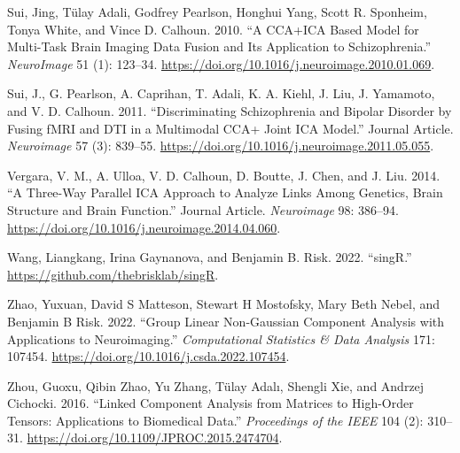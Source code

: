 \begin{CSLReferences}{1}{0}
\leavevmode{}%
Sui, Jing, Tülay Adali, Godfrey Pearlson, Honghui Yang, Scott R. Sponheim, Tonya White, and Vince D. Calhoun. 2010. {``A CCA+ICA Based Model for Multi-Task Brain Imaging Data Fusion and Its Application to Schizophrenia.''} \emph{NeuroImage} 51 (1): 123--34. \url{https://doi.org/10.1016/j.neuroimage.2010.01.069}.

\leavevmode{}%
Sui, J., G. Pearlson, A. Caprihan, T. Adali, K. A. Kiehl, J. Liu, J. Yamamoto, and V. D. Calhoun. 2011. {``Discriminating Schizophrenia and Bipolar Disorder by Fusing fMRI and DTI in a Multimodal CCA+ Joint ICA Model.''} Journal Article. \emph{Neuroimage} 57 (3): 839--55. \url{https://doi.org/10.1016/j.neuroimage.2011.05.055}.

\leavevmode{}%
Vergara, V. M., A. Ulloa, V. D. Calhoun, D. Boutte, J. Chen, and J. Liu. 2014. {``A Three-Way Parallel ICA Approach to Analyze Links Among Genetics, Brain Structure and Brain Function.''} Journal Article. \emph{Neuroimage} 98: 386--94. \url{https://doi.org/10.1016/j.neuroimage.2014.04.060}.

\leavevmode{}%
Wang, Liangkang, Irina Gaynanova, and Benjamin B. Risk. 2022. {``{singR}.''} \url{https://github.com/thebrisklab/singR}.

\leavevmode{}%
Zhao, Yuxuan, David S Matteson, Stewart H Mostofsky, Mary Beth Nebel, and Benjamin B Risk. 2022. {``Group Linear Non-Gaussian Component Analysis with Applications to Neuroimaging.''} \emph{Computational Statistics \& Data Analysis} 171: 107454. \url{https://doi.org/10.1016/j.csda.2022.107454}.

\leavevmode{}%
Zhou, Guoxu, Qibin Zhao, Yu Zhang, Tülay Adalı, Shengli Xie, and Andrzej Cichocki. 2016. {``Linked Component Analysis from Matrices to High-Order Tensors: Applications to Biomedical Data.''} \emph{Proceedings of the IEEE} 104 (2): 310--31. \url{https://doi.org/10.1109/JPROC.2015.2474704}.

\end{CSLReferences}


\address{%
Liangkang Wang\\
Brown University\\%
Department of Biostatistics\\ Providence, Rhode Island, US\\
%
%
\textit{ORCiD: \href{https://orcid.org/0000-0003-3393-243X}{0000-0003-3393-243X}}\\%
\href{mailto:liangkang_wang@brown.edu}{\nolinkurl{liangkang\_wang@brown.edu}}%
}

